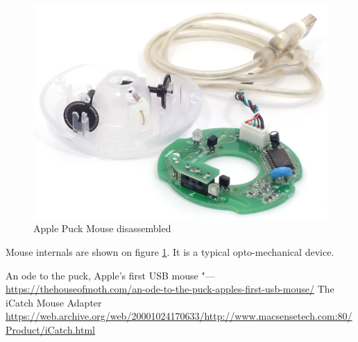 \documentclass[11pt, a4paper]{article}
\begin{document}
\begin{figure}[h]
    \centering
    \includegraphics[scale=0.6]{1998_apple_puck/apple62.jpg}
    \caption{Apple Puck Mouse disassembled}
    \label{fig:inside}
\end{figure}

Mouse internals are shown on figure  \ref{fig:inside}. It is a typical opto-mechanical device.

\begin{thebibliography}{9}

     An ode to the puck, Apple's first USB mouse "--- \url{https://thehouseofmoth.com/an-ode-to-the-puck-apples-first-usb-mouse/} 
     The iCatch Mouse Adapter \url{https://web.archive.org/web/20001024170633/http://www.macsensetech.com:80/Product/iCatch.html}
\end{thebibliography}
\end{document}
